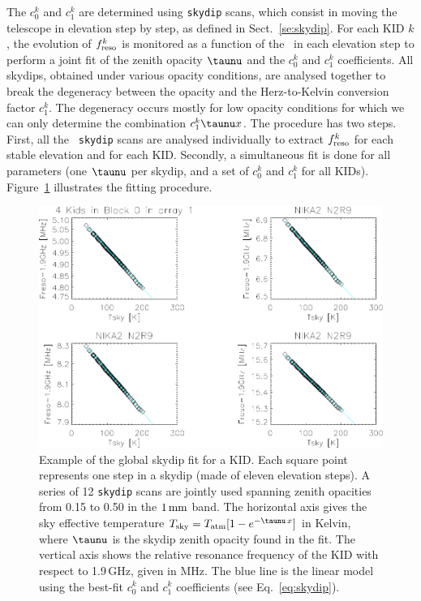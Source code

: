 The $c_0^k$ and $c_1^k$ are determined using {\tt skydip} scans, which
consist in moving the telescope in elevation step by step, as
defined in Sect.~\ref{se:skydip}. For each KID $k$, the evolution
of $f_{\rm{reso}}^k$ is monitored as a function of the \airmass\ in each
elevation step to perform a joint fit of the zenith opacity $\taunu$ and
the $c_0^k$ and $c_1^k$ coefficients.
All skydips, obtained under various opacity conditions, are analysed
together to break the degeneracy between the opacity and the
Herz-to-Kelvin conversion factor $c_1^k$. The degeneracy occurs mostly for low opacity
conditions for which we can only determine the combination
$c_1^k \taunu x$. The procedure has two steps. First, all the {\tt
skydip} scans are analysed individually to extract $f_{\rm{reso}}^k$ for each
stable elevation and for each KID. Secondly, a simultaneous fit is done
for all parameters (one $\taunu$ per skydip, and a set of $c_0^k$ and
$c_1^k$ for all KIDs). Figure~\ref{fig:skydipfitexample} illustrates the
fitting procedure.
%
\begin{figure}[!htbp]
\begin{center}
\includegraphics[trim={9cm 0cm 0cm 6.5cm}, clip=true, width=0.9\linewidth]{Figures/test_allskd4_N2R9v5_5-crop.pdf}
\caption[]{Example of the global skydip fit for a KID.
Each square point represents one step in a skydip (made of eleven
elevation steps). A series of 12 {\tt skydip} scans are jointly used
spanning zenith opacities from 0.15 to 0.50 {\lp in the $1\,\rm{mm}$ band}. The horizontal axis gives the sky
effective temperature $T_{\rm{sky}} = T_{\rm{atm}}[1-e^{-\taunu\, x}]$ in Kelvin, where $\taunu$ is the
skydip zenith opacity found in the fit. The vertical axis shows the relative
resonance frequency of the KID with respect to 1.9\,GHz, given in MHz. The blue line is the linear
model using the best-fit $c_0^k$ and $c_1^k$ coefficients (see
Eq.~\ref{eq:skydip}).}
\label{fig:skydipfitexample}
\end{center}
\end{figure}
